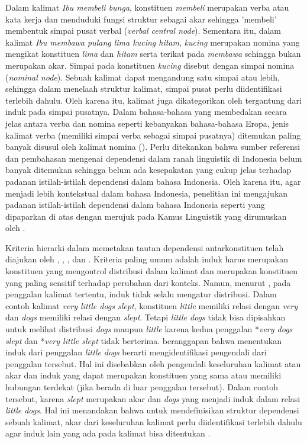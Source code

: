 Dalam kalimat \textit{Ibu membeli bunga}, konstituen \textit{membeli} merupakan verba atau kata kerja dan menduduki fungsi struktur sebagai akar sehingga 'membeli' membentuk simpai pusat verbal (\textit{verbal central node}). Sementara itu, dalam kalimat \textit{Ibu membawa pulang lima kucing hitam}, \textit{kucing} merupakan nomina yang mengikat konstituen \textit{lima} dan \textit{hitam} serta terikat pada \textit{membawa} sehingga bukan merupakan akar. Simpai pada konstituen \textit{kucing} disebut dengan simpai nomina (\textit{nominal node}). Sebuah kalimat dapat mengandung satu simpai atau lebih, sehingga dalam menelaah struktur kalimat, simpai pusat perlu diidentifikasi terlebih dahulu. Oleh karena itu, kalimat juga dikategorikan oleh \cite{tesniere1959elements} tergantung dari induk pada simpai pusatnya. Dalam bahasa-bahasa yang membedakan secara jelas antara verba dan nomina seperti kebanyakan bahasa-bahasa Eropa, jenis kalimat verba (memiliki simpai verba sebagai simpai pusatnya) ditemukan paling banyak disusul oleh kalimat nomina (\citealp{tesniere1959elements, hudson2007language}). Perlu ditekankan bahwa sumber referensi dan pembahasan mengenai dependensi dalam ranah linguistik di Indonesia belum banyak ditemukan sehingga belum ada kesepakatan yang cukup jelas terhadap padanan istilah-istilah dependensi dalam bahasa Indonesia. Oleh karena itu, agar menjadi lebih kontekstual dalam bahasa Indonesia, penelitian ini mengajukan padanan istilah-istilah dependensi dalam bahasa Indonesia seperti yang dipaparkan di atas dengan merujuk pada Kamus Linguistik yang dirumuskan oleh \cite{kridalaksana2008kamus}.

Kriteria hierarki dalam memetakan tautan dependensi antarkonstituen telah diajukan oleh \cite{bloomfield1933language}, \cite{zwicky1985heads}, \cite{garde1977ordre}, dan \cite{mel'vcuk1988dependency}. Kriteria paling umum adalah induk harus merupakan konstituen yang mengontrol distribusi dalam kalimat dan merupakan konstituen yang paling sensitif terhadap perubahan dari konteks. Namun, menurut \cite{gerdes2013defining}, pada penggalan kalimat tertentu, induk tidak selalu mengatur distribusi. Dalam contoh kalimat \textit{very little dogs slept}, konstituen \textit{little} memiliki relasi dengan \textit{very} dan \textit{dogs} memiliki relasi dengan \textit{slept}. Tetapi \textit{little dogs} tidak bisa dipisahkan untuk melihat distribusi \textit{dogs} maupun \textit{little} karena kedua penggalan *\textit{very dogs slept} dan *\textit{very little slept} tidak berterima. \cite{gerdes2013defining} beranggapan bahwa menentukan induk dari penggalan \textit{little dogs} berarti mengidentifikasi pengendali dari penggalan tersebut. Hal ini disebabkan oleh pengendali keseluruhan kalimat atau akar dan induk yang dapat merupakan konstituen yang sama atau memiliki hubungan terdekat (jika berada di luar penggalan tersebut). Dalam contoh tersebut, karena \textit{slept} merupakan akar dan \textit{dogs} yang menjadi induk dalam relasi \textit{little dogs}. Hal ini menandakan bahwa untuk mendefinisikan struktur dependensi sebuah kalimat, akar dari keseluruhan kalimat perlu diidentifikasi terlebih dahulu agar induk lain yang ada pada kalimat bisa ditentukan \citep{gerdes2013defining}. 


